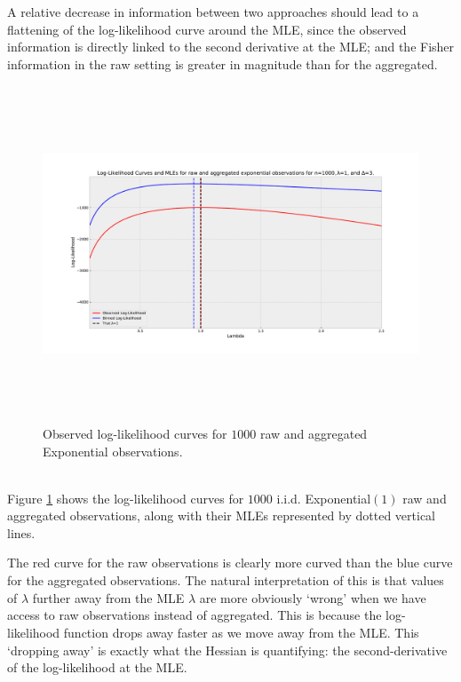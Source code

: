 \documentclass[11pt,a4,twosided,singlespacing,titlepagenumber=on,numbers=endperiod]{scrreprt}
\numberwithin{equation}{chapter} %
\theoremstyle{remark}
\begin{document}
A relative decrease in information between two approaches should lead to a flattening of the log-likelihood curve around the MLE, since the observed information is directly linked to the second derivative at the MLE; and the Fisher information in the raw setting is greater in magnitude than for the aggregated.
\begin{figure}[!h]
	\includegraphics[height=10cm, width=14cm]{exp_log_likelihood.pdf}
	\centering
	\caption{Observed log-likelihood curves for $1000$ raw and aggregated Exponential observations.}
	\label{fig:exp_log_likelihood}
\end{figure}\\\noindent
Figure \ref{fig:exp_log_likelihood} shows the log-likelihood curves for $1000$ i.i.d. Exponential$(1)$ raw and aggregated observations, along with their MLEs represented by dotted vertical lines.

The red curve for the raw observations is clearly more curved than the blue curve for the aggregated observations. The natural interpretation of this is that values of $\lambda$ further away from the MLE $\hat{\lambda}$ are more obviously `wrong' when we have access to raw observations instead of aggregated. This is because the log-likelihood function drops away faster as we move away from the MLE. This `dropping away' is exactly what the Hessian is quantifying: the second-derivative of the log-likelihood at the MLE.

\newpage
\end{document}
